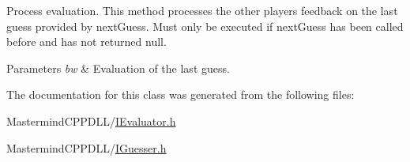 Process evaluation. This method processes the other player\textquotesingle{}s feedback on the last guess provided by {\ttfamily next\+Guess}. Must only be executed if {\ttfamily next\+Guess} has been called before and has not returned {\ttfamily null}. 


\begin{DoxyParams}{Parameters}
{\em bw} & Evaluation of the last guess. \\
\hline
\end{DoxyParams}


The documentation for this class was generated from the following files\+:\begin{DoxyCompactItemize}
\item 
Mastermind\+C\+P\+P\+D\+L\+L/\hyperlink{_i_evaluator_8h}{I\+Evaluator.\+h}\item 
Mastermind\+C\+P\+P\+D\+L\+L/\hyperlink{_i_guesser_8h}{I\+Guesser.\+h}\end{DoxyCompactItemize}
